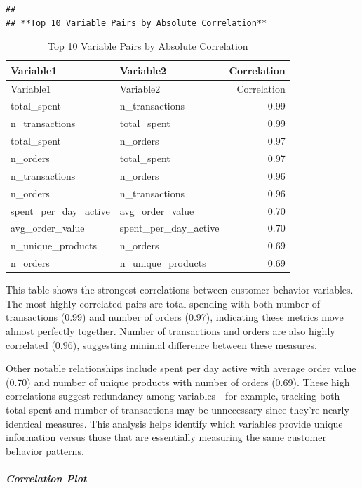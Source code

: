 \documentclass[
]{article}
\begin{document}
\begin{verbatim}
## 
## **Top 10 Variable Pairs by Absolute Correlation**
\end{verbatim}

\begin{longtable}[]{@{}llr@{}}
\caption{Top 10 Variable Pairs by Absolute Correlation}\tabularnewline
\toprule\noalign{}
Variable1 & Variable2 & Correlation \\
\midrule\noalign{}
\endfirsthead
\toprule\noalign{}
Variable1 & Variable2 & Correlation \\
\midrule\noalign{}
\endhead
\bottomrule\noalign{}
\endlastfoot
total\_spent & n\_transactions & 0.99 \\
n\_transactions & total\_spent & 0.99 \\
total\_spent & n\_orders & 0.97 \\
n\_orders & total\_spent & 0.97 \\
n\_transactions & n\_orders & 0.96 \\
n\_orders & n\_transactions & 0.96 \\
spent\_per\_day\_active & avg\_order\_value & 0.70 \\
avg\_order\_value & spent\_per\_day\_active & 0.70 \\
n\_unique\_products & n\_orders & 0.69 \\
n\_orders & n\_unique\_products & 0.69 \\
\end{longtable}

This table shows the strongest correlations between customer behavior
variables. The most highly correlated pairs are total spending with both
number of transactions (0.99) and number of orders (0.97), indicating
these metrics move almost perfectly together. Number of transactions and
orders are also highly correlated (0.96), suggesting minimal difference
between these measures.

Other notable relationships include spent per day active with average
order value (0.70) and number of unique products with number of orders
(0.69). These high correlations suggest redundancy among variables - for
example, tracking both total spent and number of transactions may be
unnecessary since they're nearly identical measures. This analysis helps
identify which variables provide unique information versus those that
are essentially measuring the same customer behavior patterns.\newpage

\subparagraph{Correlation Plot}\label{correlation-plot}
\end{document}
